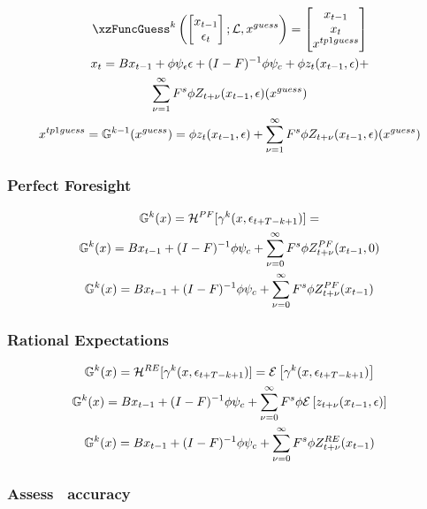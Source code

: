 \documentclass[tikz]{beamer}
\begin{document}
\begin{frame}

{\small
  \begin{gather}
  \xzFuncGuess^k \left (
  \begin{bmatrix}
    x_{t-1} \\\epsilon_t
  \end{bmatrix}; \linMod,\xguss
\right )=
  \begin{bmatrix}
    x_{t-1}\\ x_t\\ \xtpguss
  \end{bmatrix}\\
x_t= \sumLinPart + \sumZPartZero +\\  \sumZPartPos(\xguss)  \label{seriesForm}\\ 
\xtpguss=\XZFunc^{k-1}(\xguss) = \sumZPartZero +  \sumZPartPos(\xguss)
  \end{gather}
}
\end{frame}

\begin{frame}
\frametitle{Perfect Foresight}




\begin{gather}
{\mathbb{G}}^{k}(x)=     \mathcal{H}^{PF}[{{\gamma}}^{k}(x,\epsilon_{t+T-k+1})]=\\
{\mathbb{G}}^{k}(x)={ B x_{t-1}+ (I - F)^{-1} \phi \psi_c } +   { \sum_{{\nu}=0}^\infty F^s \phi Z^{PF}_{t+{\nu}}(x_{t-1},0) }\\
 {\mathbb{G}}^{k}(x)={ B x_{t-1}+ (I - F)^{-1} \phi \psi_c } + { \sum_{{\nu}=0}^\infty F^s \phi {Z^{PF}_{t+{\nu}}(x_{t-1})} }
\end{gather}

\end{frame}
\begin{frame}
  
 \frametitle{Rational Expectations}

 \begin{gather}
 {\mathbb{G}}^{k}(x)=     \mathcal{H}^{RE}[{{\gamma}}^{k}(x,\epsilon_{t+T-k+1})]=
 {\mathcal{E}\left [ {{\gamma}}^{k}(x,\epsilon_{t+T-k+1}) \right ]}\\
  {\mathbb{G}}^{k}(x)={ B x_{t-1}+ (I - F)^{-1} \phi \psi_c } + { \sum_{{\nu}=0}^\infty F^s \phi {\mathcal{E}\left [ z_{t+{\nu}}(x_{t-1},\epsilon) \right ]} }\\
 {\mathbb{G}}^{k}(x)={ B x_{t-1}+ (I - F)^{-1} \phi \psi_c } + { \sum_{{\nu}=0}^\infty F^s \phi {Z^{RE}_{t+{\nu}}(x_{t-1})} }
 \end{gather}

\end{frame}

\begin{frame}
  \frametitle{Assess \ADR\  accuracy}
\end{frame}
\end{document}
